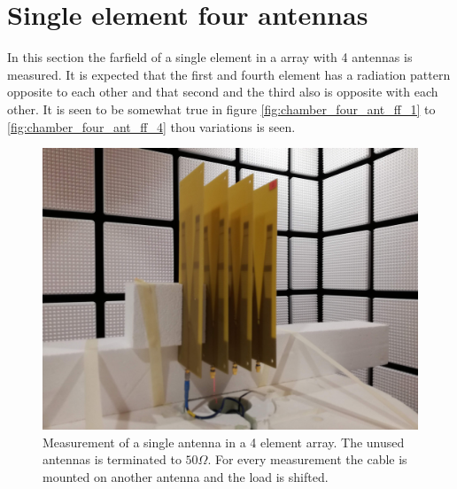 \section{Single element four antennas}
In this section the farfield of a single element in a array with 4 antennas is measured. It is expected that the first and fourth element has a radiation pattern opposite to each other and that second and the third also is opposite with each other. It is seen to be somewhat true in figure \ref{fig:chamber_four_ant_ff_1} to \ref{fig:chamber_four_ant_ff_4} thou variations is seen.     


\begin{figure}[H]
\centering 
\includegraphics[scale = 0.05]{figures/measurement/antennas/single_element_array.jpg}
\caption{Measurement of a single antenna in a 4 element array. The unused antennas is terminated to $50\Omega$. For every measurement the cable is mounted on another antenna and the load is shifted.}
\label{fig:chamber_four_ant0}
\end{figure} 



